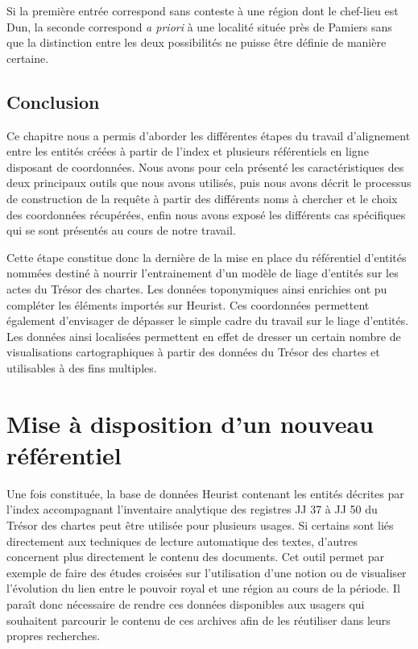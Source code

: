 \documentclass[a4paper,12pt,twoside]{book}
\begin{document}
	\noindent Si la première entrée correspond sans conteste à une région dont le chef-lieu est Dun, la seconde correspond \textit{a priori} à une localité située près de Pamiers sans que la distinction entre les deux possibilités ne puisse être définie de manière certaine.
	
	\section*{Conclusion}
	
	Ce chapitre nous a permis d'aborder les différentes étapes du travail d'alignement entre les entités créées à partir de l'index et plusieurs référentiels en ligne disposant de coordonnées. Nous avons pour cela présenté les caractéristiques des deux principaux outils que nous avons utilisés, puis nous avons décrit le processus de construction de la requête à partir des différents noms à chercher et le choix des coordonnées récupérées, enfin nous avons exposé les différents cas spécifiques qui se sont présentés au cours de notre travail.
	
	Cette étape constitue donc la dernière de la mise en place du référentiel d'entités nommées destiné à nourrir l'entrainement d'un modèle de liage d'entités sur les actes du Trésor des chartes. Les données toponymiques ainsi enrichies ont pu compléter les éléments importés sur Heurist. Ces coordonnées permettent également d'envisager de dépasser le simple cadre du travail sur le liage d'entités. Les données ainsi localisées permettent en effet de dresser un certain nombre de visualisations cartographiques à partir des données du Trésor des chartes et utilisables à des fins multiples.
	
		
	\chapter{Mise à disposition d'un nouveau référentiel}
	
	Une fois constituée, la base de données Heurist contenant les entités décrites par l'index accompagnant l'inventaire analytique des registres JJ 37 à JJ 50 du Trésor des chartes peut être utilisée pour plusieurs usages. Si certains sont liés directement aux techniques de lecture automatique des textes, d'autres concernent plus directement le contenu des documents. Cet outil permet par exemple de faire des études croisées sur l'utilisation d'une notion ou de visualiser l'évolution du lien entre le pouvoir royal et une région au cours de la période. Il paraît donc nécessaire de rendre ces données disponibles aux usagers qui souhaitent parcourir le contenu de ces archives afin de les réutiliser dans leurs propres recherches.
	
\end{document}
